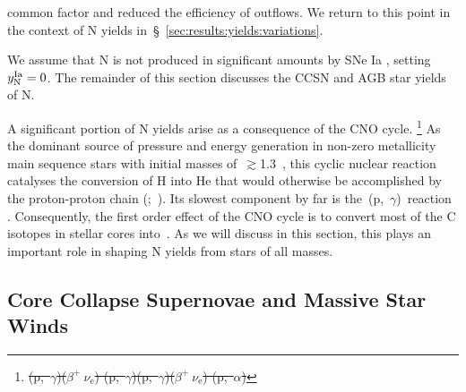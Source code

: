\documentclass[ms.tex]{subfiles}
\begin{document}
common factor and reduced the efficiency of outflows.
We return to this point in the context of N yields
in~\S~\ref{sec:results:yields:variations}.
\par
We assume that N is not produced in significant amounts by SNe Ia
\citep{Johnson2019}, setting~$y_\text{N}^\text{Ia} = 0$.
The remainder of this section discusses the CCSN and AGB star yields of N.
\par
A significant portion of N yields arise as a consequence of the CNO
cycle.
\footnote{
	\color{red}
	\sout{
	\Ctwelve(p,~$\gamma$)\Nthirteen($\beta^+~\nu_\text{e}$)\Cthirteen
	(p,~$\gamma$)\Nfourteen(p,~$\gamma$)\Ofifteen($\beta^+~\nu_\text{e}$)
	\Nfifteen(p,~$\alpha$)\Ctwelve
	}
}
As the dominant source of pressure and energy generation in non-zero
metallicity main sequence stars with initial masses of~$\gtrsim$1.3~\msun, this
cyclic nuclear reaction catalyses the conversion of H into He that would
otherwise be accomplished by the proton-proton chain
(\citealp{vonWeizsaecker1937, vonWeizsaecker1938, Bethe1939a, Bethe1939b,
Adelberger2011};~\citealp*{Suliga2021}).
Its slowest component by far is the~\Nfourteen(p,~$\gamma$)\Ofifteen~reaction
\citep[e.g.][]{LUNA2006}.
Consequently, the first order effect of the CNO cycle is to convert most of the
C isotopes in stellar cores into~\Nfourteen.
As we will discuss in this section, this plays an important role in shaping N
yields from stars of all masses.

\subsection{Core Collapse Supernovae and Massive Star Winds}
\label{sec:yields:ccsne}
\end{document}
